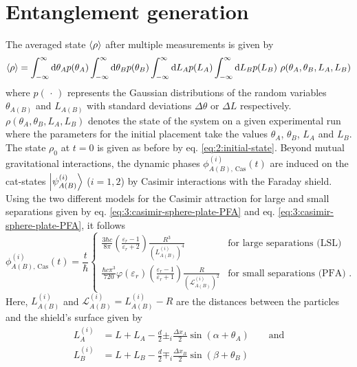\section{Entanglement generation}\label{sec:4:entanglement-generation}
The averaged state $\left\langle\rho\right\rangle$ after multiple measurements is given by
\begin{equation}\label{eq:4:average-density}
  \left\langle\rho\right\rangle = \int_{-\infty}^{\infty} \dd \theta_A p(\theta_A) \int_{-\infty}^{\infty} \dd \theta_B p(\theta_B) \int_{-\infty}^{\infty} \dd L_A p(L_A) \int_{-\infty}^{\infty} \dd L_B p(L_B) \ \rho(\theta_A, \theta_B, L_A, L_B)
\end{equation} 
where $p(\,\cdot\,)$ represents the Gaussian distributions of the random variables 
$\theta_{A(B)}$ and $L_{A(B)}$ with standard deviations $\Delta \theta$ or $\Delta L$ respectively. 
$\rho(\theta_A, \theta_B, L_A, L_B)$ denotes the state of the system on a given experimental run where the parameters for the initial placement take the values $\theta_A$, $\theta_B$, $L_A$ and $L_B$. 
The state $\rho_0$ at $t=0$ is given as before by eq. \eqref{eq:2:initial-state}.
Beyond mutual gravitational interactions, the dynamic phases $\phi^{(i)}_{A(B),\,\mathrm{Cas}}(t)$ are induced on the cat-states $\ket{\psi^{(i)}_{A(B)}}$ ($i = 1, 2$) by Casimir interactions with the Faraday shield.
Using the two different models for the Casimir attraction for large and small separations given by eq. \eqref{eq:3:casimir-sphere-plate-PFA} and eq. \eqref{eq:3:casimir-sphere-plate-PFA}, it follows
\begin{equation}
  \phi^{(i)}_{A(B),\,\mathrm{Cas}}(t) = \frac{t}{\hbar}
  \begin{cases}
     \frac{3 \hbar c}{8 \pi} \left(\frac{\varepsilon_r - 1}{\varepsilon_r + 2}\right) \frac{R^3}{\left(L^{(i)}_{A(B)}\right)^4} & \text{for large separations (LSL)} \\
    \frac{\hbar c \pi^3}{720} \varphi(\varepsilon_r) \left(\frac{\varepsilon_r - 1}{\varepsilon_r + 1}\right) \frac{R}{\left(\mathscr{L}^{(i)}_{A(B)}\right)^2} & \text{for small separations (PFA) .}
  \end{cases}
\end{equation}
Here, $L^{(i)}_{A(B)}$ and $\mathscr{L}^{(i)}_{A(B)} = L^{(i)}_{A(B)}-R$ are the distances between the particles and the shield's surface given by
\begin{align}\label{eq:4:L-casimir}
  L^{(i)}_{A} &= L + L_{A} - \frac{d}{2} \pm_i \frac{\Delta x_{A}}{2} \sin(\alpha + \theta_{A}) \quad \quad \text{and} \\
  L^{(i)}_{B} &= L + L_{B} - \frac{d}{2} \mp_i \frac{\Delta x_{B}}{2} \sin(\beta + \theta_{B})
\end{align}
